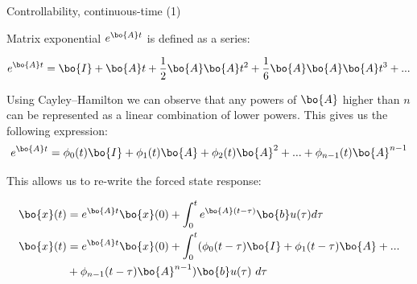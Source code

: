 \documentclass{beamer}
\begin{document}
\begin{frame}{Controllability, continuous-time (1)}
	\begin{flushleft}
		
		Matrix exponential $e^{\bo{A}t}$ is defined as a series:
		
		\begin{equation}
			e^{\bo{A}t} = \bo{I}+\bo{A}t+\frac{1}{2} \bo{A}\bo{A}t^2
			+\frac{1}{6} \bo{A}\bo{A}\bo{A}t^3 + ...
		\end{equation}
	
		Using Cayley–Hamilton we can observe that any powers of $\bo{A}$ higher than $n$ can be represented as a linear combination of lower powers. This gives us the following expression:
		\begin{equation}
			e^{\bo{A}t} = \phi_0(t)\bo{I}+\phi_1(t)\bo{A}+\phi_2(t) \bo{A}^2 + ...
 + \phi_{n-1}(t) \bo{A}^{n-1}
		\end{equation}
		
		This allows us to re-write the forced state response:
		
		\begin{align*}
			\bo{x}(t) &= e^{\bo{A}t}  \bo{x}(0) + 
			\int_{0}^{t} e^{\bo{A}(t-\tau)} \bo{b}  u(\tau) d\tau
			\\
			\bo{x}(t) &= e^{\bo{A}t}  \bo{x}(0) + 
			\int_{0}^{t} 
			( \phi_0(t-\tau)\bo{I}+\phi_1(t-\tau)\bo{A}+ ... 
			\\
			&+ \phi_{n-1}(t-\tau) \bo{A}^{n-1} ) 
			\bo{b}  u(\tau) \ d\tau
		\end{align*}
		
		
	\end{flushleft}
\end{frame}
\end{document}
